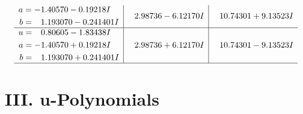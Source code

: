\documentclass[1p]{elsarticle_modified}
\theoremstyle{definition}
\begin{document}
$$\begin{array}{c|c|c}
\begin{aligned}
a &= -1.40570 - 0.19218 I \\
b &= \phantom{-}1.193070 - 0.241401 I\end{aligned}
 & \phantom{-}2.98736 - 6.12170 I & \phantom{-}10.74301 + 9.13523 I \\ \hline\begin{aligned}
u &= \phantom{-}0.80605 - 1.83438 I \\
a &= -1.40570 + 0.19218 I \\
b &= \phantom{-}1.193070 + 0.241401 I\end{aligned}
 & \phantom{-}2.98736 + 6.12170 I & \phantom{-}10.74301 - 9.13523 I\\
 \hline 
 \end{array}$$\newpage
\newpage\renewcommand{\arraystretch}{1}
\centering \section*{ III. u-Polynomials}
\end{document}
